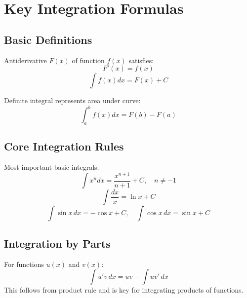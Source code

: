 \documentclass{article}
\begin{document}
\section*{Key Integration Formulas}

\subsection*{Basic Definitions}
Antiderivative $F(x)$ of function $f(x)$ satisfies:
\[F'(x) = f(x)\]
\[∫f(x)dx = F(x) + C\]

Definite integral represents area under curve:
\[∫_a^b f(x)dx = F(b) - F(a)\]

\subsection*{Core Integration Rules}
Most important basic integrals:
\[∫x^n dx = \frac{x^{n+1}}{n+1} + C, \quad n≠-1\]
\[∫\frac{dx}{x} = \ln x + C\]
\[∫\sin x\,dx = -\cos x + C, \quad ∫\cos x\,dx = \sin x + C\]

\subsection*{Integration by Parts}
For functions $u(x)$ and $v(x)$:
\[∫u'v\,dx = uv - ∫uv'\,dx\]
This follows from product rule and is key for integrating products of functions.
\end{document}
